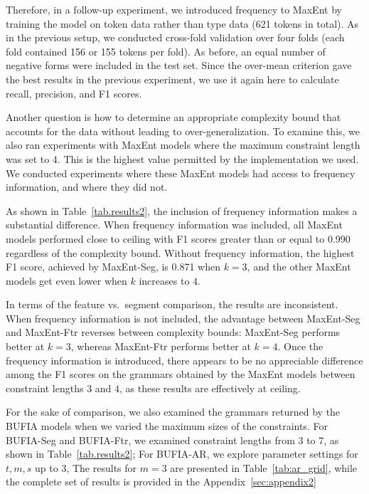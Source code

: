 Therefore, in a follow-up experiment, we introduced frequency
to MaxEnt by training the model on token data rather
than type data (621 tokens in total).
As in the previous setup, we conducted cross-fold validation over four
folds (each fold contained 156 or 155 tokens per fold).
As before, an equal number of negative forms were included in the test set.
Since the over-mean criterion gave the best results in the previous experiment,
we use it again here to calculate recall, precision, and F1 scores.


Another question is how to determine an appropriate
complexity bound that accounts for the data without leading to
over-generalization. To examine this, we also ran experiments with
MaxEnt models where the maximum constraint length was set to 4.
This is the highest value permitted by the implementation we used.
We conducted experiments where these MaxEnt models had access to 
frequency information, and where they did not. 
% 

As shown in Table~\ref{tab.results2}, 
the inclusion of frequency information makes a substantial 
difference. When frequency information was included,
all MaxEnt models performed close to ceiling with F1 scores
greater than or equal to 0.990 regardless of the complexity bound. 
Without frequency information, the highest F1 score, achieved by 
MaxEnt-Seg, is 0.871 when $k=3$, and the other MaxEnt models get
even lower when $k$ increases to $4$.

In terms of the feature vs.\ segment comparison, the results are 
inconsistent. When frequency information is not included, the advantage 
between MaxEnt-Seg and MaxEnt-Ftr reverses between complexity bounds: 
MaxEnt-Seg performs better at $k=3$, whereas MaxEnt-Ftr performs 
better at $k=4$. Once the frequency information is introduced, 
there appears to be no appreciable difference among the F1 
scores on the grammars obtained by the MaxEnt models between constraint lengths $3$ and $4$, as these results are effectively at ceiling.


For the sake of comparison, we also examined the grammars returned by
the BUFIA models when we varied the maximum sizes of the constraints.
For BUFIA-Seg and BUFIA-Ftr, we examined constraint lengths from 
3 to 7, as shown in Table~\ref{tab.results2};
For BUFIA-AR, we explore parameter settings for $t,m,s$ up to $3$,
The results for $m=3$ are presented in Table~\ref{tab:ar_grid}, while 
the complete set of results is provided in the Appendix~\ref{sec:appendix2}


